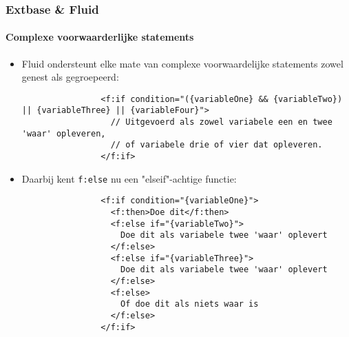 \begin{frame}[fragile]
	\frametitle{Extbase \& Fluid}
	\framesubtitle{Complexe voorwaarderlijke statements}

	\lstset{basicstyle=\tiny\ttfamily}

	\begin{itemize}

		\item Fluid ondersteunt elke mate van complexe voorwaardelijke statements zowel
			genest als gegroepeerd:

			\begin{lstlisting}
				<f:if condition="({variableOne} && {variableTwo}) || {variableThree} || {variableFour}">
				  // Uitgevoerd als zowel variabele een en twee 'waar' opleveren,
				  // of variabele drie of vier dat opleveren.
				</f:if>
			\end{lstlisting}

		\item Daarbij kent \texttt{f:else} nu een "elseif"-achtige functie:

			\begin{lstlisting}
				<f:if condition="{variableOne}">
				  <f:then>Doe dit</f:then>
				  <f:else if="{variableTwo}">
				    Doe dit als variabele twee 'waar' oplevert
				  </f:else>
				  <f:else if="{variableThree}">
				    Doe dit als variabele twee 'waar' oplevert
				  </f:else>
				  <f:else>
				    Of doe dit als niets waar is
				  </f:else>
				</f:if>
			\end{lstlisting}

	\end{itemize}

\end{frame}


